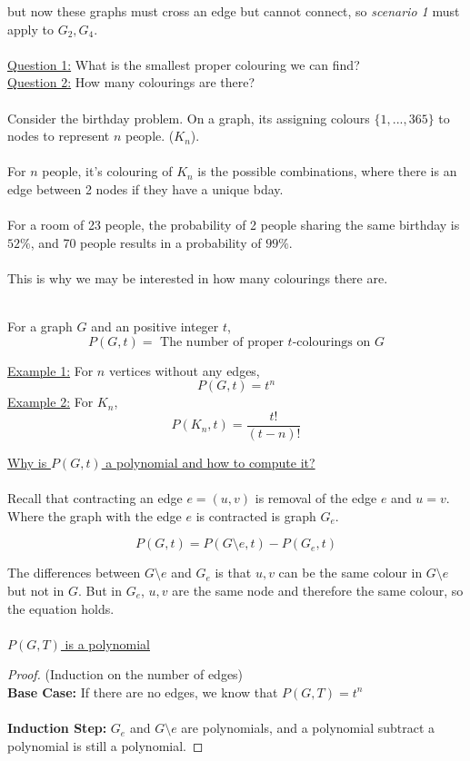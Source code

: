 \documentclass[12pt]{article}
\begin{document}
but now these graphs must cross an edge but cannot connect, so \textit{scenario 1} must apply to $G_2, G_4$.\\
\\
\underline{Question 1:} What is the smallest proper colouring we can find?\\
\underline{Question 2:} How many colourings are there?\\
\\
Consider the birthday problem. On a graph, its assigning colours $\{ 1,...,365 \}$ to nodes to represent $n$ people. ($K_n$).\\
\\
For $n$ people, it's colouring of $K_n$ is the possible combinations, where there is an edge between 2 nodes if they have a unique bday.\\
\\
For a room of 23 people, the probability of 2 people sharing the same birthday is $52\%$, and 70 people results in a probability of $99\%$.\\
\\
This is why we may be interested in how many colourings there are.\\
\\
\begin{tcolorbox}[title=Definition: Chromatic Polynomial]
	For a graph $G$ and an positive integer $t$, $$P(G, t) = \text{ The number of proper $t$-colourings on $G$}$$
\end{tcolorbox}

\underline{Example 1:} For $n$ vertices without any edges, $$P(G,t) = t^n$$
\underline{Example 2:} For $K_n$, $$P(K_n, t) = \frac{t!}{(t-n)!}$$

\underline{Why is $P(G,t)$ a polynomial and how to compute it?}\\
\\
Recall that contracting an edge $e=(u,v)$ is removal of the edge $e$ and $u=v$. Where the graph with the edge $e$ is contracted is graph $G_e$.

$$P(G,t) = P(G \setminus e,t) - P(G_e, t)$$

The differences between $G \setminus e$ and $G_e$ is that $u,v$ can be the same colour in $G \setminus e$ but not in $G$. But in $G_e$, $u,v$ are the same node and therefore the same colour, so the equation holds.\\
\\
\underline{$P(G,T)$ is a polynomial}

\begin{proof}
	(Induction on the number of edges)\\
	\textbf{Base Case:} If there are no edges, we know that $P(G,T) = t^n$\\
	\\
	\textbf{Induction Step:} $G_e$ and $G \setminus e$ are polynomials, and a polynomial subtract a polynomial is still a polynomial.
\end{proof}
\end{document}
